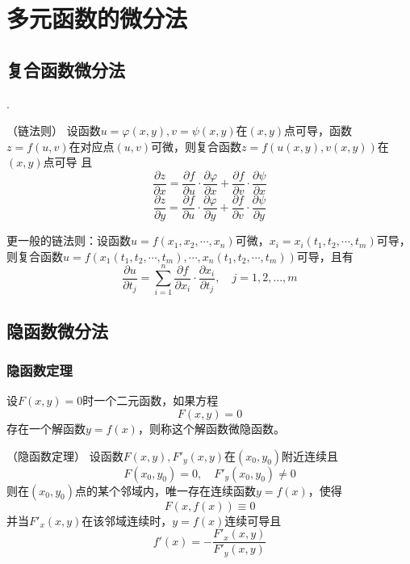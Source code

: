 \section{多元函数的微分法}
\subsection{复合函数微分法}
.
\begin{theorem}
    （链法则）
    \label{th:链法则}
    设函数$u=\varphi(x,y),v=\psi(x,y)$在$(x,y)$点可导，函数$z=f(u,v)$在对应点$(u,v)$可微，则复合函数$z=f(u(x,y),v(x,y))$在$(x,y)$点可导
    且
    \[
        \frac{\partial z}{\partial x} = \frac{\partial f}{\partial u}\cdot\frac{\partial\varphi}{\partial x} + \frac{\partial f}{\partial v}\cdot\frac{\partial\psi}{\partial x}
    \]
    \[
        \frac{\partial z}{\partial y} = \frac{\partial f}{\partial u}\cdot\frac{\partial\varphi}{\partial y} + \frac{\partial f}{\partial v}\cdot\frac{\partial\psi}{\partial y}
    \]
\end{theorem}

\begin{theorem}
    更一般的链法则：设函数$u=f(x_1,x_2,\cdots,x_n)$可微，$x_i=x_i(t_1,t_2,\cdots,t_m)$可导，则复合函数$u=f(x_1(t_1,t_2,\cdots,t_m),\cdots,x_n(t_1,t_2,\cdots,t_m))$可导，且有
    \[
        \frac{\partial u}{\partial t_j} = \sum_{i=1}^n \frac{\partial f}{\partial x_i}\cdot\frac{\partial x_i}{\partial t_j}, \quad j = 1,2,...,m
    \]
\end{theorem}

\subsection{隐函数微分法}
\subsubsection{隐函数定理}
设$F(x,y)=0$时一个二元函数，如果方程
\[ F(x,y) = 0 \]
存在一个解函数$y=f(x)$，则称这个解函数微隐函数。
\begin{theorem}
    （隐函数定理）
    \label{th:隐函数定理}
    设函数$F(x,y),F'_y(x,y)$在$(x_0,y_0)$附近连续且
    \[ F(x_0,y_0) = 0, \quad F'_y(x_0,y_0)\neq 0 \]
    则在$(x_0,y_0)$点的某个邻域内，唯一存在连续函数$y=f(x)$，使得
    \[ F(x,f(x)) \equiv 0 \]
    并当$F'_x(x,y)$在该邻域连续时，$y=f(x)$连续可导且
    \[ f'(x) = - \frac{F'_x(x,y)}{F'_y(x,y)} \]
\end{theorem}

